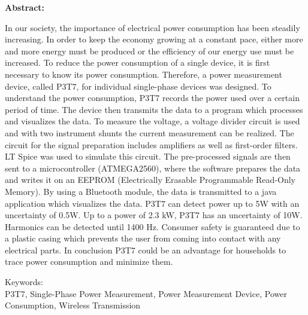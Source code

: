 \pagebreak
\textbf{Abstract:}

In our society, the importance of electrical power consumption has been steadily increasing. In order to keep the economy growing at a constant pace, either more and more energy must be produced or the efficiency of our energy use must be increased. To reduce the power consumption of a single device, it is first necessary to know its power consumption. Therefore, a power measurement device, called P3T7, for individual single-phase devices was designed. To understand the power consumption, P3T7 records the power used over a certain period of time. The device then transmits the data to a program which processes and visualizes the data. To measure the voltage, a voltage divider circuit is used and with two instrument shunts the current measurement can be realized. The circuit for the signal preparation includes amplifiers as well as first-order filters. LT Spice was used to simulate this circuit. The pre-processed signals are then sent to a microcontroller (ATMEGA2560), where the software prepares the data and writes it on an EEPROM (Electrically Erasable Programmable Read-Only Memory). By using a Bluetooth module, the data is transmitted to a java application which visualizes the data. P3T7 can detect power up to 5W with an uncertainty of 0.5W. Up to a power of 2.3 kW, P3T7 has an uncertainty of 10W. Harmonics can be detected until 1400 Hz. Consumer safety is guaranteed due to a plastic casing which prevents the user from coming into contact with any electrical parts. In conclusion P3T7 could be an advantage for households to trace power consumption and minimize them.

\vspace{13cm}
Keywords:\\
P3T7, Single-Phase Power Measurement, Power Measurement Device, Power Consumption, Wireless Transmission






\pagebreak